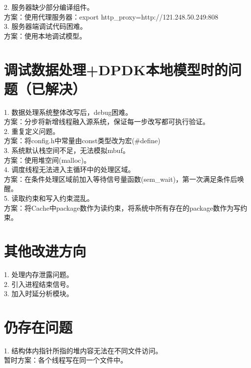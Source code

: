 \documentclass{article}
\begin{document}
2. 服务器缺少部分编译组件。\\
方案：使用代理服务器：export http\_proxy=http://121.248.50.249:808\\

3. 服务器端调试代码困难。\\
方案：使用本地调试模型。\\

\section{调试数据处理+DPDK本地模型时的问题（已解决）}
1. 数据处理系统整体改写后，debug困难。\\
方案：分步将新增线程融入源系统，保证每一步改写都可执行验证。\\

2. 重复定义问题。\\
方案：将config.h中常量由const类型改为宏(\#define)\\

3. 系统默认栈空间不足，无法模拟mbuf。\\
方案：使用堆空间(malloc)。\\

4. 调度线程无法进入主循环中的处理区域。\\
方案：在条件处理区域前加入等待信号量函数(sem\_wait)，第一次满足条件后唤醒。\\

5. 读取约束和写入约束混乱。\\
方案：将Cache中package数作为读约束，将系统中所有存在的package数作为写约束。\\

\section{其他改进方向}
1. 处理内存泄露问题。\\

2. 引入进程结束信号。\\

3. 加入时延分析模块。\\

\section{仍存在问题}
1. 结构体内指针所指的堆内容无法在不同文件访问。\\
暂时方案：各个线程写在同一个文件中。\\
\end{document}
